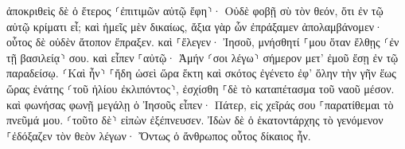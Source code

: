 \documentclass{openreader}
\begin{document}
ἀποκριθεὶς δὲ ὁ ἕτερος ⸂ἐπιτιμῶν αὐτῷ ἔφη⸃· Οὐδὲ φοβῇ σὺ τὸν θεόν, ὅτι ἐν τῷ αὐτῷ κρίματι εἶ; 
καὶ ἡμεῖς μὲν δικαίως, ἄξια γὰρ ὧν ἐπράξαμεν ἀπολαμβάνομεν· οὗτος δὲ οὐδὲν ἄτοπον ἔπραξεν. 
καὶ ⸀ἔλεγεν· Ἰησοῦ, μνήσθητί ⸀μου ὅταν ἔλθῃς ⸂ἐν τῇ βασιλείᾳ⸃ σου. 
καὶ εἶπεν ⸀αὐτῷ· Ἀμήν ⸂σοι λέγω⸃ σήμερον μετ’ ἐμοῦ ἔσῃ ἐν τῷ παραδείσῳ. 
⸂Καὶ ἦν⸃ ⸀ἤδη ὡσεὶ ὥρα ἕκτη καὶ σκότος ἐγένετο ἐφ’ ὅλην τὴν γῆν ἕως ὥρας ἐνάτης 
⸂τοῦ ἡλίου ἐκλιπόντος⸃, ἐσχίσθη ⸀δὲ τὸ καταπέτασμα τοῦ ναοῦ μέσον. 
καὶ φωνήσας φωνῇ μεγάλῃ ὁ Ἰησοῦς εἶπεν· Πάτερ, εἰς χεῖράς σου ⸀παρατίθεμαι τὸ πνεῦμά μου. ⸂τοῦτο δὲ⸃ εἰπὼν ἐξέπνευσεν. 
Ἰδὼν δὲ ὁ ἑκατοντάρχης τὸ γενόμενον ⸀ἐδόξαζεν τὸν θεὸν λέγων· Ὄντως ὁ ἄνθρωπος οὗτος δίκαιος ἦν. 
\end{document}

